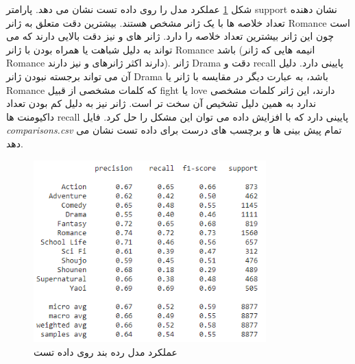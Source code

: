  شکل \ref{fig51} عملکرد مدل را روی داده تست نشان می دهد. پارامتر
 support
 نشان دهنده تعداد خلاصه ها با یک ژانر مشخص هستند. بیشترین دقت متعلق به ژانر
 Romance
 است چون این ژانر بیشترین تعداد خلاصه را دارد. ژانر های 
 و
 نیز دقت بالایی دارند که می تواند به دلیل شباهت یا همراه بودن با ژانر 
 Romance
 باشد (انیمه هایی که ژانر Romance دارند اکثر ژانرهای
 و
 نیز دارند). ژانر 
 Drama
 دقت و recall
 پایینی دارد. دلیل آن می تواند برجسته نبودن ژانر
 Drama
 باشد، به عبارت دیگر در مقایسه با ژانر 
 یا
 Romance
 که کلمات مشخصی از قبیل 
 fight 
 یا
 love
 دارند، این ژانر کلمات مشخصی ندارد به همین دلیل تشخیص آن سخت تر است. ژانر
 نیز به دلیل کم بودن تعداد داکیومنت ها 
recall
پایینی دارد که با افزایش داده می توان این مشکل را حل کرد. فایل 
\textit{comparisons.csv}
تمام پیش بینی ها و برچسب های درست برای داده تست نشان می دهد.
 
 
 \begin{figure}[H]
 	\centering
 	
 	\includegraphics[width=0.8\textwidth,height=0.8\textheight,keepaspectratio]{images/5-1}
 	\caption{عملکرد مدل رده بند روی داده تست}
 	\label{fig51}
 	
 \end{figure} 
 

